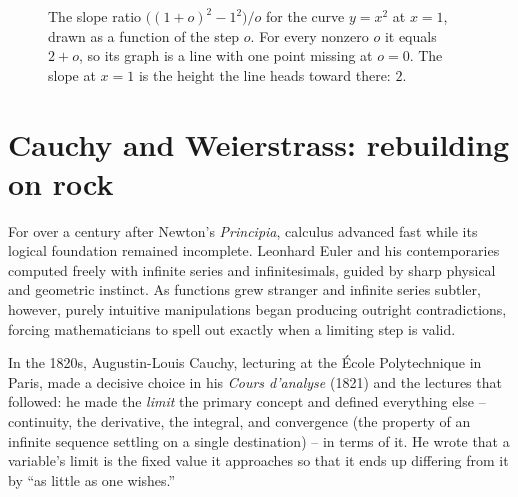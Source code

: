 \begin{figure}[htbp]
\centering
{}
\caption{The slope ratio $\bigl((1+o)^2-1^2\bigr)/o$ for the curve $y=x^2$ at $x=1$, drawn as a
function of the step $o$. For every nonzero $o$ it equals $2+o$, so its graph is a line with one
point missing at $o=0$. The slope at $x=1$ is the height the line heads toward there: $2$.}
\label{ch05:ratio-hole}
\end{figure}

\section{Cauchy and Weierstrass: rebuilding on rock}

For over a century after Newton's \emph{Principia}, calculus advanced
fast while its logical foundation remained incomplete. Leonhard Euler
and his contemporaries computed freely with infinite series and infinitesimals,
guided by sharp physical and geometric instinct. As functions grew
stranger and infinite series subtler, however, purely intuitive manipulations began producing outright
contradictions, forcing mathematicians to spell out exactly when a limiting step is valid.

In the 1820s, Augustin-Louis Cauchy, lecturing at the \'Ecole Polytechnique in Paris, made a
decisive choice in his \emph{Cours d'analyse} (1821) and the lectures that followed: he made the \emph{limit} the primary
concept and defined everything else -- continuity, the derivative, the integral, and convergence
(the property of an infinite sequence settling on a single destination) -- in terms of it. He
wrote that a variable's limit is the fixed value it approaches so that it ends up differing from
it by ``as little as one wishes.''

